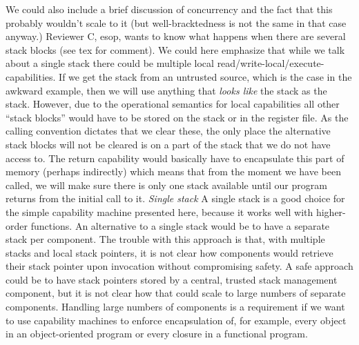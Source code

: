 \documentclass[format=acmsmall, review=false, screen=true]{acmart}
\newcommand{\itoplassug}[1]
    {{\color{Blue} #1}}
\begin{document}
\itoplassug{We could also include a brief discussion of concurrency and the fact that this probably wouldn't scale to it (but well-bracktedness is not the same in that case anyway.) }
\itoplassug{Reviewer C, esop, wants to know what happens when there are several stack blocks (see tex for comment). We could here emphasize that while we talk about a single stack there could be multiple local read/write-local/execute-capabilities. If we get the stack from an untrusted source, which is the case in the awkward example, then we will use anything that \emph{looks like} the stack as the stack. However, due to the operational semantics for local capabilities all other ``stack blocks'' would have to be stored on the stack or in the register file. As the calling convention dictates that we clear these, the only place the alternative stack blocks will not be cleared is on a part of the stack that we do not have access to. The return capability would basically have to encapsulate this part of memory (perhaps indirectly) which means that from the moment we have been called, we will make sure there is only one stack available until our program returns from the initial call to it.}
\emph{Single stack} A single stack is a good choice for the simple capability
machine presented here, because it works well with higher-order functions. An
alternative to a single stack would be to have a separate stack per component.
The trouble with this approach is that, with multiple stacks and local stack
pointers, it is not clear how components would retrieve their stack pointer upon
invocation without compromising safety. A safe approach could be to have stack
pointers stored by a central, trusted stack management component, but it is not
clear how that could scale to large numbers of separate components. Handling
large numbers of components is a requirement if we want to use
capability machines to enforce encapsulation of, for example, every object in an
object-oriented program or every closure in a functional program.
\\\\
\end{document}
